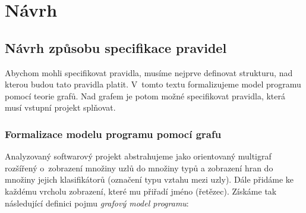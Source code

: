 \chapter{Návrh}

\section{Návrh způsobu specifikace pravidel}

Abychom mohli specifikovat pravidla, musíme nejprve definovat strukturu, nad kterou budou tato pravidla platit. V~tomto textu formalizujeme model programu pomocí teorie grafů. Nad grafem je potom možné specifikovat pravidla, která musí vstupní projekt splňovat.

\subsection{Formalizace modelu programu pomocí grafu}
\label{design-graph_formalization}

Analyzovaný softwarový projekt abstrahujeme jako orientovaný multigraf rozšířený o~zobrazení množiny uzlů do množiny typů a zobrazení hran do množiny jejich klasifikátorů (označení typu vztahu mezi uzly). Dále přidáme ke každému vrcholu zobrazení, které mu přiřadí jméno (řetězec). Získáme tak následující definici pojmu \emph{grafový model programu}:

